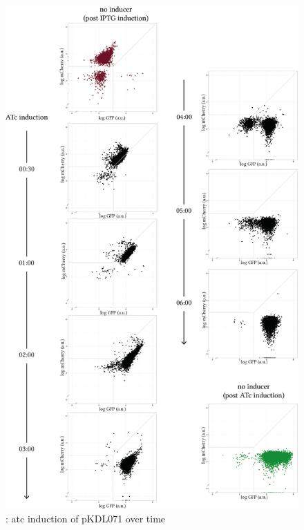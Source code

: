 \begin{figure}[tb]
	\begin{center}
\includegraphics[scale=0.7]{chapterCharacterisation/images/pKDL071_atc_time.png}
\caption[LoF caption]{\label{fig:switch_timecourse_atc}: \acrshort{atc} induction of pKDL071 over time}
\end{center}
\end{figure}


